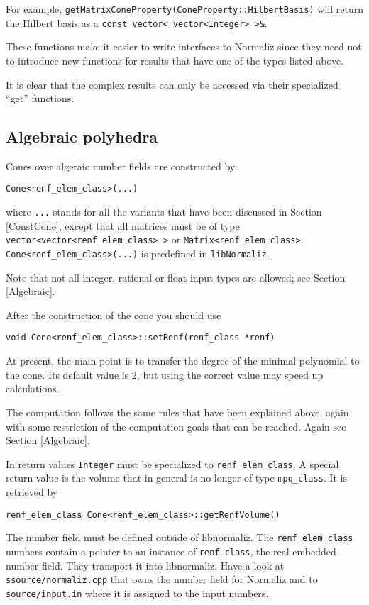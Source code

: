 \documentclass[12pt,a4paper]{scrartcl}
\theoremstyle{definition}
\def\ttt{\texttt}
\begin{document}
\begin{small}
For example, \verb|getMatrixConeProperty(ConeProperty::HilbertBasis)| will return the Hilbert basis as a \verb|const vector< vector<Integer> >&|. 

These functions make it easier to write interfaces to Normaliz since they need not to introduce new functions for results that have one of the types listed above.

It is clear that the complex results can only be accessed via their specialized ``get'' functions.

\subsection{Algebraic polyhedra}

Cones over algeraic number fields are constructed by
\begin{Verbatim}
Cone<renf_elem_class>(...)
\end{Verbatim}
where \ttt{...} stands for all the variants that have been discussed in Section \ref{ConstCone}, except that all matrices must be of type \verb+vector<vector<renf_elem_class> >+ or \verb+Matrix<renf_elem_class>+. \verb|Cone<renf_elem_class>(...)| is predefined in \ttt{libNormaliz}.

Note that not all integer, rational or float input types are allowed; see Section \ref{Algebraic}.

After the construction of the cone you should use
\begin{Verbatim}
void Cone<renf_elem_class>::setRenf(renf_class *renf)
\end{Verbatim}
At present, the main point is to transfer the degree of the minimal polynomial to the cone. Its default value is $2$, but using the correct value may speed up calculations.

The computation follows the same rules that have been explained above, again with some restriction of the computation goals that can be reached. Again see Section \ref{Algebraic}.

In return values \ttt{Integer} must be specialized to \verb|renf_elem_class|. A special return value is the volume that in general is no longer of type \verb|mpq_class|. It is retrieved by
\begin{Verbatim}
renf_elem_class Cone<renf_elem_class>::getRenfVolume() 
\end{Verbatim}

The number field must be defined outside of libnormaliz. The  \verb|renf_elem_class| numbers contain a pointer to an instance of  \verb|renf_class|, the real embedded number field. They transport it into libnormaliz. Have a look at \verb|ssource/normaliz.cpp| that owns the number field for Normaliz and  to \verb|source/input.in| where it is assigned to the input numbers.


\end{small}
\end{document}
